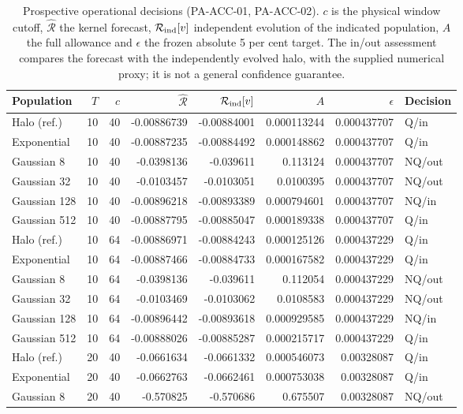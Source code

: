 \documentclass[fleqn,usenatbib]{mnras}
\begin{document}
\begin{table}
\centering
\caption{Prospective operational decisions (PA-ACC-01, PA-ACC-02). $c$ is the physical window cutoff, $\widehat{\mathcal R}$ the kernel forecast, $\mathcal R_{\rm ind}[v]$ independent evolution of the indicated population, $A$ the full allowance and $\epsilon$ the frozen absolute 5 per cent target. The in/out assessment compares the forecast with the independently evolved halo, with the supplied numerical proxy; it is not a general confidence guarantee.}\label{tab-acc}
\small
\setlength{\tabcolsep}{4pt}
\begin{tabular}{lrrrrrrl}
\toprule
Population & $T$ & $c$ & $\widehat{\mathcal R}$ & $\mathcal R_{\rm ind}[v]$ & $A$ & $\epsilon$ & Decision \\
\midrule
Halo (ref.) & 10 & 40 & -0.00886739 & -0.00884001 & 0.000113244 & 0.000437707 & Q/in \\
Exponential & 10 & 40 & -0.00887235 & -0.00884492 & 0.000148862 & 0.000437707 & Q/in \\
Gaussian 8 & 10 & 40 & -0.0398136 & -0.039611 & 0.113124 & 0.000437707 & NQ/out \\
Gaussian 32 & 10 & 40 & -0.0103457 & -0.0103051 & 0.0100395 & 0.000437707 & NQ/out \\
Gaussian 128 & 10 & 40 & -0.00896218 & -0.00893389 & 0.000794601 & 0.000437707 & NQ/in \\
Gaussian 512 & 10 & 40 & -0.00887795 & -0.00885047 & 0.000189338 & 0.000437707 & Q/in \\
Halo (ref.) & 10 & 64 & -0.00886971 & -0.00884243 & 0.000125126 & 0.000437229 & Q/in \\
Exponential & 10 & 64 & -0.00887466 & -0.00884733 & 0.000167582 & 0.000437229 & Q/in \\
Gaussian 8 & 10 & 64 & -0.0398136 & -0.039611 & 0.112054 & 0.000437229 & NQ/out \\
Gaussian 32 & 10 & 64 & -0.0103469 & -0.0103062 & 0.0108583 & 0.000437229 & NQ/out \\
Gaussian 128 & 10 & 64 & -0.00896442 & -0.00893618 & 0.000929585 & 0.000437229 & NQ/in \\
Gaussian 512 & 10 & 64 & -0.00888026 & -0.00885287 & 0.000215717 & 0.000437229 & Q/in \\
Halo (ref.) & 20 & 40 & -0.0661634 & -0.0661332 & 0.000546073 & 0.00328087 & Q/in \\
Exponential & 20 & 40 & -0.0662763 & -0.0662461 & 0.000753038 & 0.00328087 & Q/in \\
Gaussian 8 & 20 & 40 & -0.570825 & -0.570686 & 0.675507 & 0.00328087 & NQ/out \\

\end{tabular}
\end{table}
\end{document}
